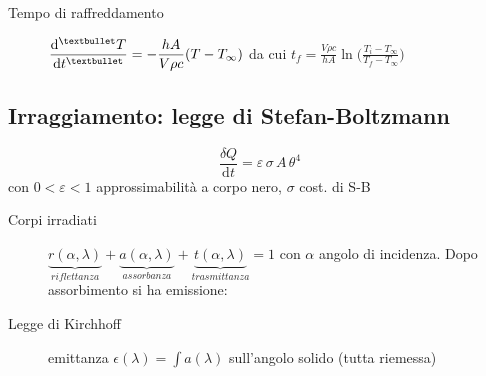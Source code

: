 \documentclass[10pt, oneside]{article}
\begin{document}
\begin{minipage}{0.4\textwidth}
\vspace{0cm}
\centering
{}
\vfill
\end{minipage}

\begin{description}
\item[Tempo di raffreddamento] $\displaystyle \dv[•]{T}{t} = - \frac{h A}{V \rho c}(T - T_\infty)$ da cui $\displaystyle t_f = \frac{V \rho c}{h A} \ln \bigg( \frac{T_i - T_\infty}{T_f - T_\infty} \bigg)$
\end{description}
\subsection*{Irraggiamento: legge di Stefan-Boltzmann}
\[\boxed{\frac{\delta Q}{\mathrm{d}t} = \varepsilon \, \sigma \, A \, \theta^4}\]
con $0<\varepsilon<1$ approssimabilità a corpo nero, $\sigma$ cost. di S-B

\begin{description}
\item[Corpi irradiati] $\displaystyle \underbrace{r(\alpha, \lambda)}_{riflettanza} + \underbrace{a(\alpha, \lambda)}_{assorbanza} + \underbrace{t(\alpha, \lambda)}_{trasmittanza} = 1$ con $\alpha$ angolo di incidenza. Dopo assorbimento si ha emissione:
\item[Legge di Kirchhoff] emittanza $\displaystyle \epsilon(\lambda) = \int a(\lambda)$ sull'angolo solido (tutta riemessa)
\end{description}
\end{document}
